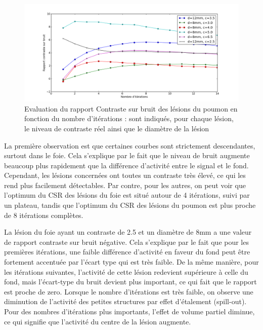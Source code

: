 \begin{figure}
\centering
\includegraphics[width=17cm]{images/CNRPoumon}
\caption[Evaluation du rapport "contraste sur bruit" des lésions du poumon en fonction du nombre d'itérations]{Evaluation du rapport Contraste sur bruit des lésions du poumon en fonction du nombre d'itérations : sont indiqués, pour chaque lésion, le niveau de contraste réel ainsi que le diamètre de la lésion}
\label{fig:CNRPoumon}
\end{figure}

La première observation est que certaines courbes sont strictement descendantes, surtout dans le foie. Cela s'explique par le fait que le niveau de bruit augmente beaucoup plus rapidement que la différence d'activité entre le signal et le fond. Cependant, les lésions concernées ont toutes un contraste très élevé, ce qui les rend plus facilement détectables. Par contre, pour les autres, on peut voir que l'optimum du CSR des lésions du foie est situé autour de 4 itérations, suivi par un plateau, tandis que l'optimum du CSR des lésions du poumon est plus proche de 8 itérations complètes.

La lésion du foie ayant un contraste de 2.5 et un diamètre de 8mm a une valeur de rapport contraste sur bruit négative. Cela s'explique par le fait que pour les premières itérations, une faible différence d'activité en faveur du fond peut être fortement accentuée par l'écart type qui est très faible. De la même manière, pour les itérations suivantes, l'activité de cette lésion redevient supérieure à celle du fond, mais l'écart-type du bruit devient plus important, ce qui fait que le rapport est proche de zero. Lorsque le nombre d'itérations est très faible, on observe une diminution de l'activité des petites structures par effet d'étalement (spill-out). Pour des nombres d'itérations plus importants, l'effet de volume partiel diminue, ce qui signifie que l'activité du centre de la lésion augmente.

